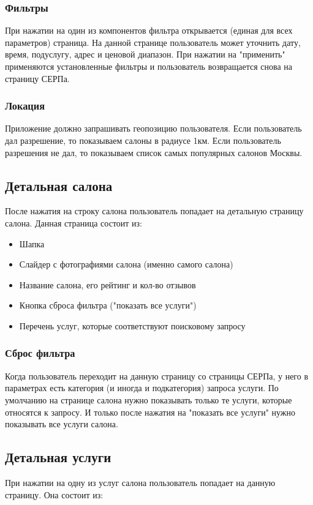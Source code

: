 \documentclass[DIV=calc, paper=a4, fontsize=11pt]{scrartcl} %
\begin{document}
\subsubsection{Фильтры}
При нажатии на один из компонентов фильтра открывается (единая для всех параметров) страница. На данной странице пользователь может уточнить дату, время, подуслугу, адрес и ценовой диапазон. При нажатии на "применить" применяются установленные фильтры и пользователь возвращается снова на страницу СЕРПа.

\subsubsection{Локация} \label{subsubsec:location}
Приложение должно запрашивать геопозицию пользователя. Если пользователь дал разрешение, то показываем салоны в радиусе 1км. Если пользователь разрешения не дал, то показываем список самых популярных салонов Москвы.


\subsection{Детальная салона}
После нажатия на строку салона пользователь попадает на детальную страницу салона. Данная страница состоит из:

\begin{itemize}
	\item Шапка
	\item Слайдер с фотографиями салона (именно самого салона)
	\item Название салона, его рейтинг и кол-во отзывов
	\item Кнопка сброса фильтра ("показать все услуги")
	\item Перечень услуг, которые соответствуют поисковому запросу 
\end{itemize}

\subsubsection{Сброс фильтра}
Когда пользователь переходит на данную страницу со страницы СЕРПа, у него в параметрах есть категория (и иногда и подкатегория) запроса услуги. По умолчанию на странице салона нужно показывать только те услуги, которые относятся к запросу. И только после нажатия на "показать все услуги" нужно показывать все услуги салона.

\subsection{Детальная услуги}
При нажатии на одну из услуг салона пользователь попадает на данную страницу. Она состоит из:
\end{document}

